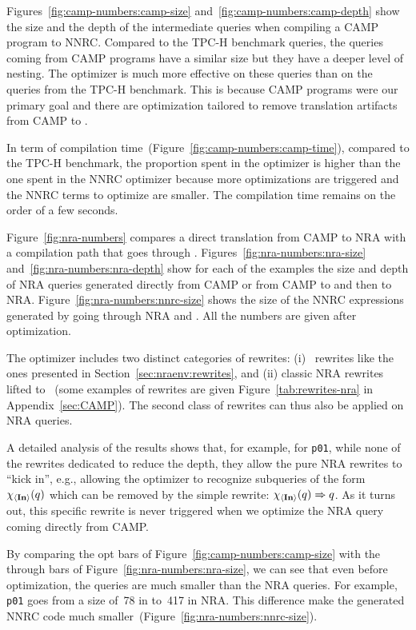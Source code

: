 Figures~\ref{fig:camp-numbers:camp-size}
and~\ref{fig:camp-numbers:camp-depth} show the size and the depth of
the intermediate queries when compiling a CAMP program to NNRC.
%
Compared to the TPC-H benchmark queries, the
\NRAEnv queries coming from CAMP programs have a similar size but they
have a deeper level of nesting.
%
The optimizer is much more effective on these
queries than on the queries from the TPC-H benchmark. This is because
CAMP programs were our primary goal and there are optimization
tailored to remove translation artifacts from CAMP to \NRAEnv.

In term of compilation time~(Figure~\ref{fig:camp-numbers:camp-time}),
compared to the TPC-H benchmark, the proportion spent in the \NRAEnv optimizer
is higher than the one spent in the NNRC optimizer
because more \NRAEnv optimizations are triggered
and the NNRC terms to optimize are smaller.
%
The compilation time remains on the order of a few seconds.

Figure~\ref{fig:nra-numbers} compares a direct translation
from CAMP to NRA with a compilation path that goes through \NRAEnv.
%
Figures~\ref{fig:nra-numbers:nra-size}
and~\ref{fig:nra-numbers:nra-depth} show for each of the examples the
size and depth of NRA queries generated directly from CAMP or from
CAMP to \NRAEnv and then to NRA.
%
Figure~\ref{fig:nra-numbers:nnrc-size} shows the size of the NNRC
expressions generated by going through NRA and \NRAEnv.
%
All the numbers are given after optimization.

The \NRAEnv optimizer includes two distinct categories of rewrites:
(i) \NRAEnv\ rewrites like the ones presented in
Section~\ref{sec:nraenv:rewrites},
%
and (ii) classic NRA rewrites lifted to \NRAEnv~(some examples of
rewrites are given Figure~\ref{tab:rewrites-nra} in
Appendix~\ref{sec:CAMP}).
%
The second class of rewrites can thus also be applied on NRA queries.

A detailed analysis of the results shows that, for example, for
\texttt{p01}, while none of the rewrites dedicated to \NRAEnv reduce
the depth, they allow the pure NRA rewrites to ``kick in'', e.g.,
allowing the optimizer to recognize subqueries of the
form~$\chi_{\left\langle{\textup{\textbf{{In}}}}\right\rangle}\!\left({q}\right)$ which can be removed by the simple rewrite:
$\chi_{\left\langle{\textup{\textbf{{In}}}}\right\rangle}\!\left({q}\right) \Rightarrow q$. As it turns out, this specific rewrite
is never triggered when we optimize the NRA query coming directly from
CAMP.

By comparing the \textsf{\NRAEnv opt} bars of
Figure~\ref{fig:camp-numbers:camp-size} with the \textsf{through
  \NRAEnv} bars of Figure~\ref{fig:nra-numbers:nra-size}, we can see
that even before optimization, the
\NRAEnv queries are much smaller than the NRA queries.
%
For example, \texttt{p01} goes from a size of~78 in \NRAEnv to~417 in
NRA.
%
This difference make the generated NNRC code much
smaller~(Figure~\ref{fig:nra-numbers:nnrc-size}).



